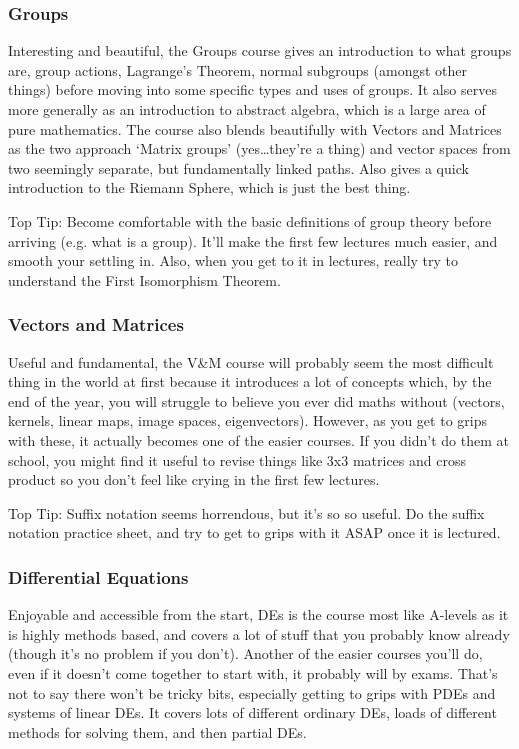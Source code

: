 \documentclass[a4paper,11pt]{article}
\begin{document}
\subsubsection{Groups}
 				 
Interesting and beautiful, the Groups course gives an introduction to what groups are, group actions, Lagrange's Theorem, normal subgroups (amongst other things) before moving into some specific types and uses of groups. It also serves more generally as an introduction to abstract algebra, which is a large area of pure mathematics. The course also blends beautifully with Vectors and Matrices as the two approach `Matrix groups' (yes\dots they're a thing) and vector spaces from two seemingly separate, but fundamentally linked paths. Also gives a quick introduction to the Riemann Sphere, which is just the best thing.

Top Tip: Become comfortable with the basic definitions of group theory before arriving (e.g. what is a group). It'll make the first few lectures much easier, and smooth your settling in. Also, when you get to it in lectures, really try to understand the First Isomorphism Theorem.

\subsubsection{Vectors and Matrices} 		
 
Useful and fundamental, the V\&M course will probably seem the most difficult thing in the world at first because it introduces a lot of concepts which, by the end of the year, you will struggle to believe you ever did maths without (vectors, kernels, linear maps, image spaces, eigenvectors). However, as you get to grips with these, it actually becomes one of the easier courses. If you didn't do them at school, you might find it useful to revise things like 3x3 matrices and cross product so you don't feel like crying in the first few lectures.

Top Tip: Suffix notation seems horrendous, but it's so so useful. Do the suffix notation practice sheet, and try to get to grips with it ASAP once it is lectured.

\subsubsection{Differential Equations}
	 
Enjoyable and accessible from the start,  DEs is the course most like A-levels as it is highly methods based, and covers a lot of stuff that you probably know already (though it's no problem if you don't). Another of the easier courses you'll do, even if it doesn't come together to start with, it probably will by exams.  That's not to say there won't be tricky bits, especially getting to grips with PDEs and systems of linear DEs. It covers lots of different ordinary DEs, loads of different methods for solving them, and then partial DEs. 
\end{document}
